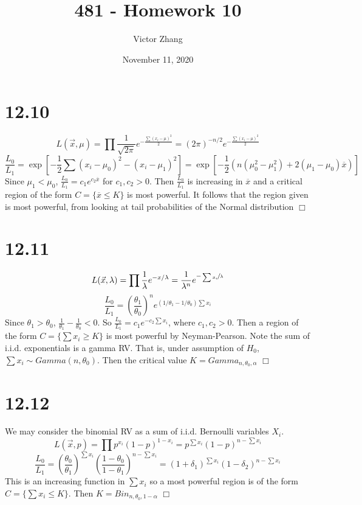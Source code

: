\documentclass{article}
\title{481 - Homework 10}
\author{Victor Zhang}
\date{November 11, 2020}
\begin{document}
\maketitle

\section*{12.10}
$$L(\vec{x}, \mu) = \prod \frac{1}{\sqrt{2\pi}} e^{-\frac{\sum(x_i-\mu)^2}{2}} = (2\pi)^{-n/2} e^{-\frac{\sum(x_i-\mu)^2}{2}}$$
$$\frac{L_0}{L_1} = \exp\left[-\frac{1}{2}\sum (x_i-\mu_0)^2 - (x_i-\mu_1)^2\right] = \exp\left[-\frac{1}{2}\left(n(\mu_0^2-\mu_1^2) + 2(\mu_1-\mu_0)\overline{x}\right)\right]$$
Since $\mu_1 < \mu_0$, $\frac{L_0}{L_1} = c_1 e^{c_2\overline{x}}$ for $c_1,c_2 > 0$. Then $\frac{L_0}{L_1}$ is increasing in $\overline{x}$ and a critical region of the form $C = \{\overline{x} \leqslant K\}$ is most powerful. It follows that the region given is most powerful, from looking at tail probabilities of the Normal distribution $\Box$

\section*{12.11}
$$L(\vec{x}, \lambda) = \prod \frac{1}{\lambda}e^{-x/\lambda} = \frac{1}{\lambda^n}e^{-\sfrac{\sum x_i}{\lambda}}$$
$$\frac{L_0}{L_1} = \left(\frac{\theta_1}{\theta_0}\right)^n e^{\left(1/\theta_1 - 1/\theta_0\right)\sum x_i}$$
Since $\theta_1 > \theta_0$, $\frac{1}{\theta_1}-\frac{1}{\theta_0} < 0$. So $\frac{L_0}{L_1} = c_1 e^{-c_2 \sum x_i}$, where $c_1,c_2 > 0$. Then a region of the form $C = \{\sum x_i \geqslant K\}$ is most powerful by Neyman-Pearson. Note the sum of i.i.d. exponentials is a gamma RV. That is, under assumption of $H_0$, $\sum x_i \sim Gamma(n,\theta_0)$. Then the critical value $K = Gamma_{n,\theta_0,\alpha}$ $\Box$

\section*{12.12}
We may consider the binomial RV as a sum of i.i.d. Bernoulli variables $X_i$.
$$L(\vec{x}, p) = \prod p^{x_i}(1-p)^{1-x_i} = p^{\sum x_i}(1-p)^{n-\sum x_i}$$
$$\frac{L_0}{L_1} = \left(\frac{\theta_0}{\theta_1}\right)^{\sum x_i} \left(\frac{1-\theta_0}{1-\theta_1}\right)^{n-\sum x_i} = (1+\delta_1)^{\sum x_i} (1-\delta_2)^{n-\sum x_i}$$
This is an increasing function in $\sum x_i$ so a most powerful region is of the form $C = \{\sum x_i \leqslant K\}$. Then $K = Bin_{n,\theta_0,1-\alpha}$ $\Box$
\end{document}
